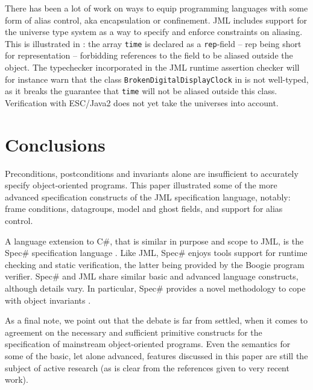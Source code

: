 \documentclass{llncs}
\begin{document}
There has been a lot of work on ways to equip programming languages
with some form of alias control, aka encapsulation or confinement.
JML includes support for the universe type system
\cite{Mueller-Poetzsch-Heffter-Leavens03} as a way to specify
and enforce constraints on aliasing. This is illustrated in 
: the array \texttt{time} is declared
as a \texttt{rep}-field -- rep being short for representation -- forbidding
references to the field to be aliased outside the object.
The typechecker incorporated in the JML runtime assertion checker
will for instance warn that the class \texttt{BrokenDigitalDisplayClock}
in  is not well-typed, as it  breaks 
the guarantee that \texttt{time} will not be aliased outside this class.
Verification with ESC/Java2 does not yet take the universes into account.

% 
%

\section{Conclusions}
\label{Sec:conclusion}

Preconditions, postconditions and invariants alone are insufficient to
accurately specify object-oriented programs.  This paper illustrated some of
the more advanced specification constructs of the JML specification language,
notably: frame conditions, datagroups, model and
ghost fields, and support for alias control.

A language extension to C\#, that is similar in purpose and scope to JML, is
the Spec\# specification language \cite{SpecSharp}.
%
Like JML, Spec\# enjoys tools support for runtime checking and static
verification, the latter being provided by the Boogie program verifier.
%
Spec\# and JML share similar basic and advanced language constructs, 
although details vary.  In particular, Spec\# provides a novel methodology to 
cope with object invariants \cite{BoogieInvariants}.

As a final note, we point out that the debate is far from settled, when it
comes to agreement on the necessary and sufficient primitive constructs
for the specification of mainstream object-oriented programs.
%
Even the semantics for some of the basic, let alone advanced, features
discussed in this paper are still the subject of active research (as is clear
from the references given to very recent work).



\end{document}
